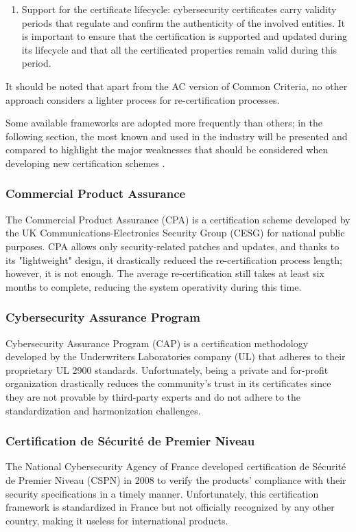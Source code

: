 \begin{enumerate}
    \item Support for the certificate lifecycle: cybersecurity certificates carry validity periods that regulate and confirm the authenticity of the involved entities. It is important to ensure that the certification is supported and updated during its lifecycle and that all the certificated properties remain valid during this period.

\end{enumerate}


It should be noted that apart from the AC version of Common Criteria, no other approach considers a lighter process for re-certification processes.

Some available frameworks are adopted more frequently than others; in the following section, the most known and used in the industry will be presented and compared to highlight the major weaknesses that should be considered when developing new certification schemes \cite{surveyIOT}.

\subsubsection{Commercial Product Assurance}
The Commercial Product Assurance (CPA) is a certification scheme developed by the UK Communications-Electronics Security Group (CESG) for national public purposes. CPA allows only security-related patches and updates, and thanks to its "lightweight" design, it drastically reduced the re-certification process length; however, it is not enough. The average re-certification still takes at least six months to complete, reducing the system operativity during this time.

\subsubsection{Cybersecurity Assurance Program}
Cybersecurity Assurance Program (CAP) is a certification methodology developed by the Underwriters Laboratories company (UL) that adheres to their proprietary UL 2900 standards. Unfortunately, being a private and for-profit organization drastically reduces the community's trust in its certificates since they are not provable by third-party experts and do not adhere to the standardization and harmonization challenges.

\subsubsection{Certification de Sécurité de Premier Niveau}
The National Cybersecurity Agency of France developed certification de Sécurité de Premier Niveau (CSPN) in 2008 to verify the products' compliance with their security specifications in a timely manner. Unfortunately, this certification framework is standardized in France but not officially recognized by any other country, making it useless for international products.

